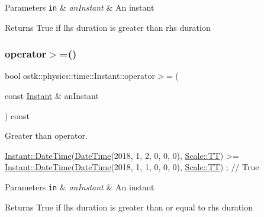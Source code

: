 \begin{DoxyParams}[1]{Parameters}
\mbox{\tt in}  & {\em an\+Instant} & An instant \\
\hline
\end{DoxyParams}
\begin{DoxyReturn}{Returns}
True if lhs duration is greater than rhs duration 
\end{DoxyReturn}
\mbox{\label{classostk_1_1physics_1_1time_1_1_instant_af5370a5e8c4b39f46f2baf79105b35cc}} 
\subsubsection{\texorpdfstring{operator$>$=()}{operator>=()}}
{\footnotesize\ttfamily bool ostk\+::physics\+::time\+::\+Instant\+::operator$>$= (\begin{DoxyParamCaption}\item[{const \hyperlink{classostk_1_1physics_1_1time_1_1_instant}{Instant} \&}]{an\+Instant }\end{DoxyParamCaption}) const}



Greater than operator. 


\begin{DoxyCode}
\hyperlink{classostk_1_1physics_1_1time_1_1_instant_afd5725574a02389b80fad4baff313c8a}{Instant::DateTime}(\hyperlink{classostk_1_1physics_1_1time_1_1_instant_afd5725574a02389b80fad4baff313c8a}{DateTime}(2018, 1, 2, 0, 0, 0), 
      \hyperlink{namespaceostk_1_1physics_1_1time_adf23d37bd8641fb76a0e98ab46a70df7adf1f3edb9115acb0a1e04209b7a9937b}{Scale::TT}) >= \hyperlink{classostk_1_1physics_1_1time_1_1_instant_afd5725574a02389b80fad4baff313c8a}{Instant::DateTime}(\hyperlink{classostk_1_1physics_1_1time_1_1_instant_afd5725574a02389b80fad4baff313c8a}{DateTime}(2018, 1, 1, 0, 0, 0), 
      \hyperlink{namespaceostk_1_1physics_1_1time_adf23d37bd8641fb76a0e98ab46a70df7adf1f3edb9115acb0a1e04209b7a9937b}{Scale::TT}) ; \textcolor{comment}{// True}
\end{DoxyCode}



\begin{DoxyParams}[1]{Parameters}
\mbox{\tt in}  & {\em an\+Instant} & An instant \\
\hline
\end{DoxyParams}
\begin{DoxyReturn}{Returns}
True if lhs duration is greater than or equal to rhs duration 
\end{DoxyReturn}
\mbox{\label{classostk_1_1physics_1_1time_1_1_instant_a710ff6dec3b97f4e10bcfeae6335eb56}} 
